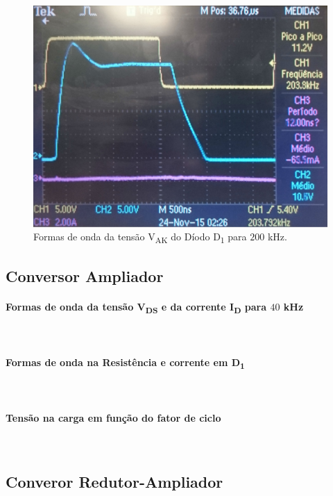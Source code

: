 \documentclass[a4paper,11pt]{article}
\numberwithin{equation}{section}
\begin{document}
\begin{figure}[H]
	\centering
	\includegraphics[keepaspectratio=true, scale=0.175]{img/figs/vak_hf_buck}
	\caption{Formas de onda da tensão V\textsubscript{AK} do Díodo D\textsubscript{1} para $200$ kHz.}
	\label{fig:vak_hf_buck}
	\vspace{-0.8em}
\end{figure}


\subsection{Conversor Ampliador}

\paragraph{Formas de onda da tensão V\textsubscript{DS} e da corrente I\textsubscript{D} para $40$ kHz}\mbox{}\

\paragraph{Formas de onda na Resistência e corrente em D\textsubscript{1}}\mbox{}\

\paragraph{Tensão na carga em função do fator de ciclo}\mbox{}\

\subsection{Converor Redutor-Ampliador}
\end{document}

